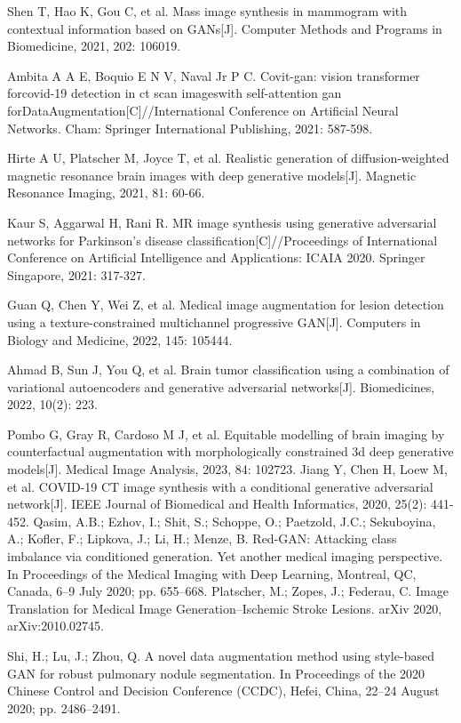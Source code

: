 \documentclass[preprint,12pt,authoryear]{elsarticle}
\begin{document}
\begin{thebibliography}{00}
Shen T, Hao K, Gou C, et al. Mass image synthesis in mammogram with contextual information based on GANs[J]. Computer Methods and Programs in Biomedicine, 2021, 202: 106019.

Ambita A A E, Boquio E N V, Naval Jr P C. Covit-gan: vision transformer forcovid-19 detection in ct scan imageswith self-attention gan forDataAugmentation[C]//International Conference on Artificial Neural Networks. Cham: Springer International Publishing, 2021: 587-598.

Hirte A U, Platscher M, Joyce T, et al. Realistic generation of diffusion-weighted magnetic resonance brain images with deep generative models[J]. Magnetic Resonance Imaging, 2021, 81: 60-66.

Kaur S, Aggarwal H, Rani R. MR image synthesis using generative adversarial networks for Parkinson’s disease classification[C]//Proceedings of International Conference on Artificial Intelligence and Applications: ICAIA 2020. Springer Singapore, 2021: 317-327.

Guan Q, Chen Y, Wei Z, et al. Medical image augmentation for lesion detection using a texture-constrained multichannel progressive GAN[J]. Computers in Biology and Medicine, 2022, 145: 105444.

Ahmad B, Sun J, You Q, et al. Brain tumor classification using a combination of variational autoencoders and generative adversarial networks[J]. Biomedicines, 2022, 10(2): 223.

Pombo G, Gray R, Cardoso M J, et al. Equitable modelling of brain imaging by counterfactual augmentation with morphologically constrained 3d deep generative models[J]. Medical Image Analysis, 2023, 84: 102723.
Jiang Y, Chen H, Loew M, et al. COVID-19 CT image synthesis with a conditional generative adversarial network[J]. IEEE Journal of Biomedical and Health Informatics, 2020, 25(2): 441-452.
Qasim, A.B.; Ezhov, I.; Shit, S.; Schoppe, O.; Paetzold, J.C.; Sekuboyina, A.; Kofler, F.; Lipkova, J.; Li, H.; Menze, B. Red-GAN: Attacking class imbalance via conditioned generation. Yet another medical imaging perspective. In Proceedings of the Medical Imaging with Deep Learning, Montreal, QC, Canada, 6–9 July 2020; pp. 655–668.
Platscher, M.; Zopes, J.; Federau, C. Image Translation for Medical Image Generation–Ischemic Stroke Lesions. arXiv 2020, arXiv:2010.02745.

Shi, H.; Lu, J.; Zhou, Q. A novel data augmentation method using style-based GAN for robust pulmonary nodule segmentation. In Proceedings of the 2020 Chinese Control and Decision Conference (CCDC), Hefei, China, 22–24 August 2020; pp. 2486–2491.


\end{thebibliography}
\end{document}
